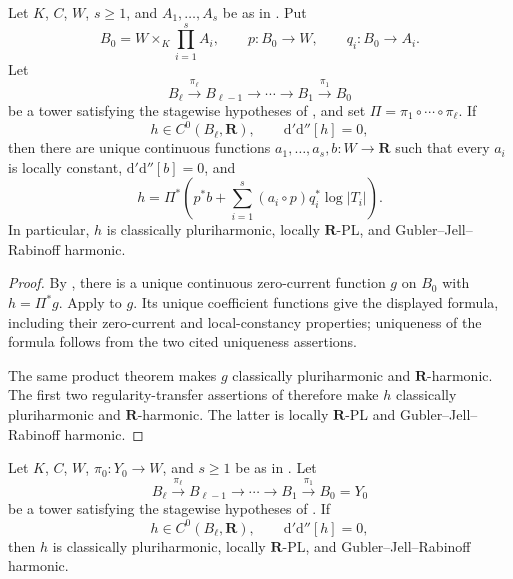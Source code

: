 \begin{corollary}
\label{cor:p062-polyannulus-base-mixed-bundle-towers}
Let $K$, $C$, $W$, $s\geq1$, and $A_1,\ldots,A_s$ be as in
.  Put
\[
 B_0=W\times_K\prod_{i=1}^sA_i,
 \qquad p:B_0\longrightarrow W,
 \qquad q_i:B_0\longrightarrow A_i.
\]
Let
\[
 B_\ell\xrightarrow{\pi_\ell}B_{\ell-1}
 \longrightarrow\cdots\longrightarrow B_1
 \xrightarrow{\pi_1}B_0
\]
be a tower satisfying the stagewise hypotheses of
, and set
$\Pi=\pi_1\circ\cdots\circ\pi_\ell$.  If
\[
 h\in C^0(B_\ell,\mathbf R),
 \qquad \mathrm d'\mathrm d''[h]=0,
\]
then there are unique continuous functions
$a_1,\ldots,a_s,b:W\to\mathbf R$ such that every $a_i$ is locally
constant, $\mathrm d'\mathrm d''[b]=0$, and
\[
 h=\Pi^*\left(p^*b+
       \sum_{i=1}^s(a_i\circ p)q_i^*\log|T_i|\right).
\]
In particular, $h$ is classically pluriharmonic, locally
$\mathbf R$-PL, and Gubler--Jell--Rabinoff harmonic.
\end{corollary}

\begin{proof}
By , there is a unique
continuous zero-current function $g$ on $B_0$ with $h=\Pi^*g$.
Apply  to $g$.
Its unique coefficient functions give the displayed formula, including
their zero-current and local-constancy properties; uniqueness of the formula
follows from the two cited uniqueness assertions.

The same product theorem makes $g$ classically pluriharmonic and
$\mathbf R$-harmonic.  The first two regularity-transfer assertions of
 therefore make $h$
classically pluriharmonic and $\mathbf R$-harmonic.  The latter is locally
$\mathbf R$-PL and Gubler--Jell--Rabinoff harmonic.
\end{proof}

\begin{corollary}
\label{cor:p062-open-polyannulus-bundle-mixed-bundle-towers}
Let $K$, $C$, $W$, $\pi_0:Y_0\to W$, and $s\geq1$ be as in
.  Let
\[
 B_\ell\xrightarrow{\pi_\ell}B_{\ell-1}
 \longrightarrow\cdots\longrightarrow B_1
 \xrightarrow{\pi_1}B_0=Y_0
\]
be a tower satisfying the stagewise hypotheses of
.  If
\[
 h\in C^0(B_\ell,\mathbf R),
 \qquad \mathrm d'\mathrm d''[h]=0,
\]
then $h$ is classically pluriharmonic, locally $\mathbf R$-PL, and
Gubler--Jell--Rabinoff harmonic.
\end{corollary}

